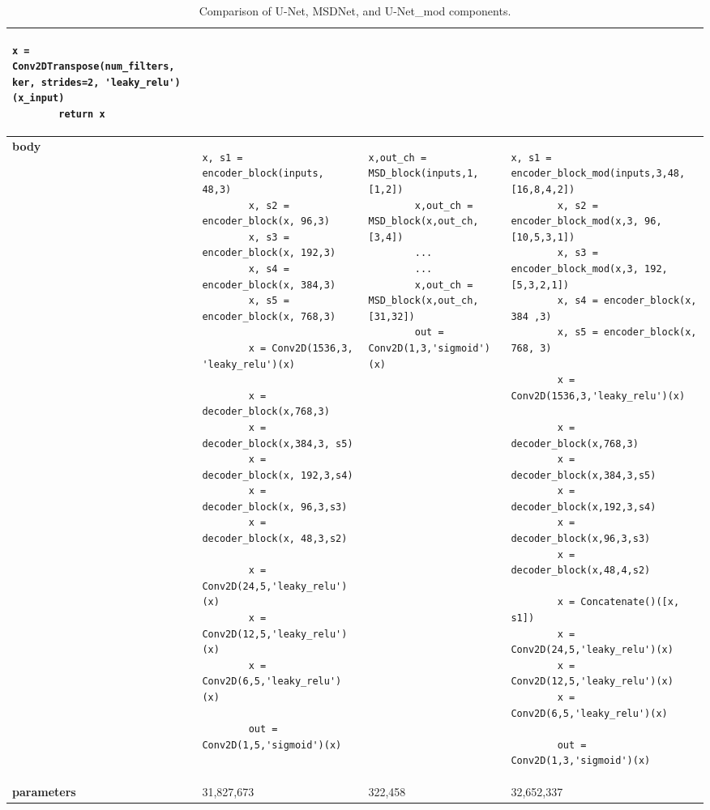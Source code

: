 \begin{table}[h!]
\begin{tabular}{|>{\centering\arraybackslash\bfseries}p{1.2cm}|p{4.5cm}|p{4.5cm}|p{4.5cm}|}
\begin{lstlisting}[basicstyle=\tiny\ttfamily, xleftmargin=-1em]
        x = Conv2DTranspose(num_filters, ker, strides=2, 'leaky_relu')(x_input)
        return x
    \end{lstlisting} \\ \hline
    
    body & 
    \begin{lstlisting}[basicstyle=\tiny\ttfamily, xleftmargin=-1em]
        x, s1 = encoder_block(inputs, 48,3)        
        x, s2 = encoder_block(x, 96,3)             
        x, s3 = encoder_block(x, 192,3)           
        x, s4 = encoder_block(x, 384,3)           
        x, s5 = encoder_block(x, 768,3)          
    
        x = Conv2D(1536,3, 'leaky_relu')(x) 
    
        x = decoder_block(x,768,3)
        x = decoder_block(x,384,3, s5)
        x = decoder_block(x, 192,3,s4)
        x = decoder_block(x, 96,3,s3)
        x = decoder_block(x, 48,3,s2)
        
        x = Conv2D(24,5,'leaky_relu')(x) 
        x = Conv2D(12,5,'leaky_relu')(x)
        x = Conv2D(6,5,'leaky_relu')(x)
        
        out = Conv2D(1,5,'sigmoid')(x)
    \end{lstlisting} 
    & 
    \begin{lstlisting}[basicstyle=\tiny\ttfamily, xleftmargin=-1em]
        x,out_ch = MSD_block(inputs,1,[1,2])
        x,out_ch = MSD_block(x,out_ch,[3,4])
        ...
        ...
        x,out_ch = MSD_block(x,out_ch,[31,32])
        out = Conv2D(1,3,'sigmoid')(x)
    \end{lstlisting} 
    &
    \begin{lstlisting}[basicstyle=\tiny\ttfamily, xleftmargin=-1em]
        x, s1 = encoder_block_mod(inputs,3,48,[16,8,4,2])   
        x, s2 = encoder_block_mod(x,3, 96,[10,5,3,1])       
        x, s3 = encoder_block_mod(x,3, 192,[5,3,2,1])           
        x, s4 = encoder_block(x, 384 ,3)            
        x, s5 = encoder_block(x, 768, 3)                    
        
        x = Conv2D(1536,3,'leaky_relu')(x)
        
        x = decoder_block(x,768,3)    
        x = decoder_block(x,384,3,s5)  
        x = decoder_block(x,192,3,s4)  
        x = decoder_block(x,96,3,s3) 
        x = decoder_block(x,48,4,s2)  
    
        x = Concatenate()([x, s1])
        x = Conv2D(24,5,'leaky_relu')(x) 
        x = Conv2D(12,5,'leaky_relu')(x)   
        x = Conv2D(6,5,'leaky_relu')(x)
    
        out = Conv2D(1,3,'sigmoid')(x)
    \end{lstlisting} \\ \hline
    parameters & 31,827,673 & 322,458 & 32,652,337 \\ \hline
    \end{tabular}
    \caption{Comparison of U-Net, MSDNet, and U-Net\_mod components.}
    \label{tab:model_comparison}
\end{table}

